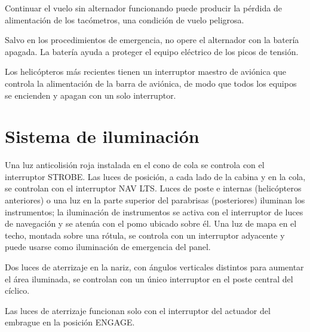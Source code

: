 \begin{precaucion}
Continuar el vuelo sin alternador funcionando puede producir la pérdida de alimentación de los tacómetros, una condición de vuelo peligrosa.
\end{precaucion}

\begin{nota}
Salvo en los procedimientos de emergencia, no opere el alternador con la batería apagada. La batería ayuda a proteger el equipo eléctrico de los picos de tensión.
\end{nota}

Los helicópteros más recientes tienen un interruptor maestro de aviónica que controla la alimentación de la barra de aviónica, de modo que todos los equipos se encienden y apagan con un solo interruptor.


\section{Sistema de iluminación}

Una luz anticolisión roja instalada en el cono de cola se controla con el interruptor \textsf{STROBE}. Las luces de posición, a cada lado de la cabina y en la cola, se controlan con el interruptor \textsf{NAV LTS}. Luces de poste e internas (helicópteros anteriores) o una luz en la parte superior del parabrisas (posteriores) iluminan los instrumentos; la iluminación de instrumentos se activa con el interruptor de luces de navegación y se atenúa con el pomo ubicado sobre él. Una luz de mapa en el techo, montada sobre una rótula, se controla con un interruptor adyacente y puede usarse como iluminación de emergencia del panel.

Dos luces de aterrizaje en la nariz, con ángulos verticales distintos para aumentar el área iluminada, se controlan con un único interruptor en el poste central del cíclico.

\begin{nota}
Las luces de aterrizaje funcionan solo con el interruptor del actuador del embrague en la posición \textsf{ENGAGE}.
\end{nota}

